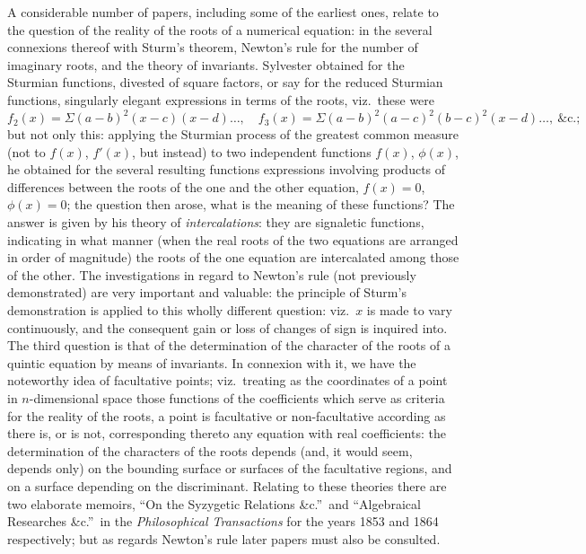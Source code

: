 \documentclass[11pt,a4paper]{article}
\begin{document}
A considerable number of papers, including some of the earliest ones, relate to the question of the reality of the roots of a numerical equation: in the several connexions thereof with Sturm's theorem, Newton's rule for the number of imaginary roots, and the theory of invariants. Sylvester obtained for the Sturmian functions, divested of square factors, or say for the reduced Sturmian functions, singularly elegant expressions in terms of the roots, viz.\ these were
\[
f_2(x) = \Sigma (a - b)^2 (x - c)(x - d) \ldots,\quad f_3(x) = \Sigma (a - b)^2 (a - c)^2 (b - c)^2 (x - d) \ldots,\ \&\text{c}.;
\]
but not only this: applying the Sturmian process of the greatest common measure (not to $f(x)$, $f'(x)$, but instead) to two independent functions $f(x)$, $\phi(x)$, he obtained for the several resulting functions expressions involving products of differences between the roots of the one and the other equation, $f(x) = 0$, $\phi(x) = 0$; the question then arose, what is the meaning of these functions? The answer is given by his theory of \emph{intercalations}: they are signaletic functions, indicating in what manner (when the real roots of the two equations are arranged in order of magnitude) the roots of the one equation are intercalated among those of the other. The investigations in regard to Newton's rule (not previously demonstrated) are very important and valuable: the principle of Sturm's demonstration is applied to this wholly different question: viz.\ $x$ is made to vary continuously, and the consequent gain or loss of changes of sign is inquired into. The third question is that of the determination of the character of the roots of a quintic equation by means of invariants. In connexion with it, we have the noteworthy idea of facultative points; viz.\ treating as the coordinates of a point in $n$-dimensional space those functions of the coefficients which serve as criteria for the reality of the roots, a point is facultative or non-facultative according as there is, or is not, corresponding thereto any equation with real coefficients: the determination of the characters of the roots depends (and, it would seem, depends only) on the bounding surface or surfaces of the facultative regions, and on a surface depending on the discriminant. Relating to these theories there are two elaborate memoirs, ``On the Syzygetic Relations \&c.''\ and ``Algebraical Researches \&c.''\ in the \emph{Philosophical Transactions} for the years 1853 and 1864 respectively; but as regards Newton's rule later papers must also be consulted.
\end{document}
